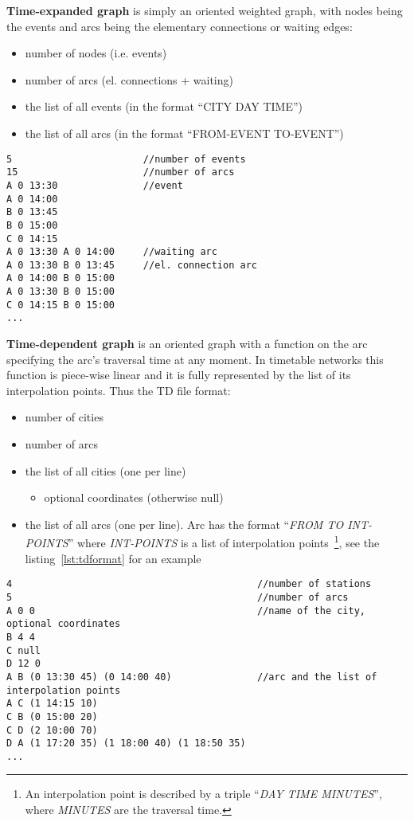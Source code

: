 \noindent \textbf{Time-expanded graph} is simply an oriented weighted graph, with nodes being the events and arcs being the elementary connections or waiting edges:
\begin{itemize}
	\item number of nodes (i.e. events)
	\item number of arcs (el. connections + waiting)
	\item the list of all events (in the format ``CITY DAY TIME'')
	\item the list of all arcs (in the format ``FROM-EVENT TO-EVENT'')
\end{itemize}
\hspace*{\fill}

\begin{lstlisting}[caption={TE file format.}]
5                       //number of events
15                      //number of arcs
A 0 13:30               //event
A 0 14:00
B 0 13:45
B 0 15:00
C 0 14:15
A 0 13:30 A 0 14:00     //waiting arc
A 0 13:30 B 0 13:45     //el. connection arc
A 0 14:00 B 0 15:00
A 0 13:30 B 0 15:00
C 0 14:15 B 0 15:00
...
\end{lstlisting}

\noindent \textbf{Time-dependent graph} is an oriented graph with a function on the arc specifying the arc's traversal time at any moment. In timetable networks this function is piece-wise linear and it is fully represented by the list of its interpolation points. Thus the TD file format:
\begin{itemize}
	\item number of cities
	\item number of arcs
	\item the list of all cities  (one per line)
	\begin{itemize}
		\item optional coordinates (otherwise null)
	\end{itemize}
	\item the list of all arcs (one per line). Arc has the format ``\textit{FROM TO INT-POINTS}'' where \textit{INT-POINTS} is a list of interpolation points~\footnote{An interpolation point is described by a triple ``\textit{DAY TIME MINUTES}'', where \textit{MINUTES} are the traversal time.}, see the listing~\ref{lst:tdformat} for an example
\end{itemize}
\hspace*{\fill}

\begin{lstlisting}[caption={TD file format.}, label={lst:tdformat}]
4                                           //number of stations
5                                           //number of arcs
A 0 0                                       //name of the city, optional coordinates
B 4 4
C null
D 12 0
A B (0 13:30 45) (0 14:00 40)               //arc and the list of interpolation points
A C (1 14:15 10)
C B (0 15:00 20)
C D (2 10:00 70)
D A (1 17:20 35) (1 18:00 40) (1 18:50 35)
...
\end{lstlisting}